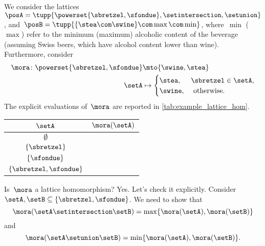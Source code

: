 \begin{example}
	We consider the lattices~$\posA=\tupp{\powerset \{\sbretzel,\sfondue\}, \setintersection, \setunion}$, and~$\posB=\tupp{\{\stea\com \swine\} \com \max \com \min}$, where~$\min$ ($\max$) refer to the minimum (maximum) alcoholic content of the beverage (assuming Swiss beers, which have alcohol content lower than wine).
	Furthermore, consider
	\begin{equation}
		\label{eq:example_lat_hom_a}
		\begin{aligned}
			\mora\colon \powerset \{\sbretzel,\sfondue\} & \mto \{\swine, \stea\}            \\
			\setA                                        & \mapsto \begin{cases}
				\stea,  & \sbretzel \in \setA, \\
				\swine, & \text{ otherwise}.
			\end{cases}
		\end{aligned}
	\end{equation}
	The explicit evaluations of~$\mora$ are reported in \cref{tab:example_lattice_hom}.
	\begin{margintable}
		\begin{center}
			\begin{tabular}{c|c}
				$\setA$                    & $\mora(\setA)$ \\
				\midrule
				$\emptyset$                & \swine         \\
				$\{\sbretzel\}$            & \stea          \\
				$\{\sfondue\}$             & \swine         \\
				$\{ \sbretzel, \sfondue\}$ & \stea
			\end{tabular}
		\end{center}
		\caption{\label{tab:example_lattice_hom}}
	\end{margintable}

	Is~$\mora$ a lattice homomorphism?
	Yes.
	Let's check it explicitly.
	Consider~$\setA,\setB\subseteq \{\sbretzel, \sfondue\}$.
	We need to show that
	\begin{equation}
		\label{eq:hom_lat_cond_a}
		\mora(\setA\setintersection \setB)=\max\{\mora(\setA),\mora(\setB)\}\\
	\end{equation}
	and
	\begin{equation}
		\label{eq:hom_lat_cond_b}
		\mora(\setA\setunion \setB)=\min\{\mora(\setA),\mora(\setB)\}.
	\end{equation}


\end{example}
